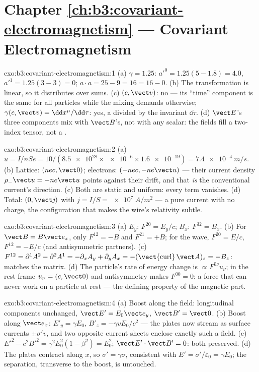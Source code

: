\section*{Chapter \ref{ch:b3:covariant-electromagnetism} --- Covariant Electromagnetism}

\begin{solution}{exo:b3:covariant-electromagnetism:1}
(a) $\gamma = 1.25$: $a'^0 = 1.25(5 - 1.8) = 4.0$, $a'^1 = 1.25(3 -
3) = 0$; $a\cdot a = 25 - 9 = 16 = 16 - 0$. (b) The transformation is
linear, so it distributes over sums. (c) $(c, \vect v)$: no --- its
``time'' component is the same for all particles while the mixing
demands otherwise; $\gamma(c, \vect v) = \dd x^\mu/\dd\tau$: yes, a
 divided by the invariant $\dd\tau$. (d) $\vect E$'s three
components mix with $\vect B$'s, not with any scalar: the fields fill
a two-index tensor, not a .
\end{solution}

\begin{solution}{exo:b3:covariant-electromagnetism:2}
(a) $u = I/nSe = 10/(\num{8.5e28} \times \num{e-6} \times
\num{1.6e-19}) = \qty{7.4e-4}{m/s}$. (b) Lattice: $(nec, \vect 0)$;
electrons: $(-nec, -ne\vect u)$ --- their current density
$\rho_-\vect u = -ne\vect u$ points against their drift, and that
\emph{is} the conventional current's direction. (c) Both are static and uniform: every term vanishes. (d)
Total: $(0, \vect\jmath)$ with $j = I/S = \qty{e7}{A/m^2}$ --- a
pure current with no charge, the configuration that makes the wire's
relativity subtle.
\end{solution}

\begin{solution}{exo:b3:covariant-electromagnetism:3}
(a) $E_y$: $F^{20} = E_y/c$; $B_x$: $F^{32} = B_x$. (b) For $\vect B
= B\vect e_z$, only $F^{12} = -B$ and $F^{21} = +B$; for the wave,
$F^{20} = E/c$, $F^{12} = -E/c$ (and antisymmetric partners). (c)
$F^{12} = \partial^1A^2 - \partial^2A^1 = -\partial_xA_y +
\partial_yA_x = -(\operatorname{\vect{curl}}\vect A)_z = -B_z$:
matches the matrix. (d) The particle's rate of energy change is
$\propto F^{0\nu}u_\nu$; in the rest frame $u_\nu = (c, \vect 0)$ and
antisymmetry makes $F^{00} = 0$: a force that can never work on a
particle at rest --- the defining property of the magnetic part.
\end{solution}

\begin{solution}{exo:b3:covariant-electromagnetism:4}
(a) Boost along the field: longitudinal components unchanged, $\vect
E' = E_0\vect e_y$, $\vect B' = \vect 0$. (b) Boost along $\vect
e_x$: $E'_y = \gamma E_0$, $B'_z = -\gamma vE_0/c^2$ --- the plates
now stream as surface currents $\pm\sigma'v$, and two opposite
current sheets enclose exactly such a field. (c) $E'^2 - c^2B'^2 =
\gamma^2E_0^2(1 - \beta^2) = E_0^2$; $\vect E'\cdot\vect B' = 0$:
both preserved. (d) The plates contract along $x$, so $\sigma' =
\gamma\sigma$, consistent with $E' = \sigma'/\varepsilon_0 = \gamma
E_0$; the separation, transverse to the boost, is untouched.
\end{solution}


